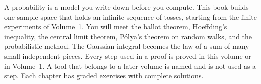 A probability is a model you write down before you compute. This book builds one sample space that holds an infinite sequence of tosses, starting from the finite experiments of Volume~1. You will meet the ballot theorem, Hoeffding's inequality, the central limit theorem, P\'olya's theorem on random walks, and the probabilistic method. The Gaussian integral becomes the law of a sum of many small independent pieces. Every step used in a proof is proved in this volume or in Volume~1. A tool that belongs to a later volume is named and is not used as a step. Each chapter has graded exercises with complete solutions.
